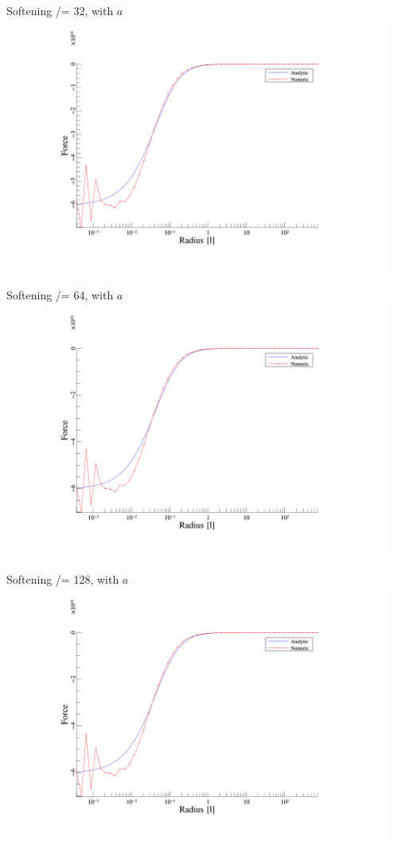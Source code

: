 \begin{frame}{Softening /= 32, with $a$}
	\includegraphics[width=0.95\textwidth]{figures/plots/forces_a_32.png}
\end{frame}

\begin{frame}{Softening /= 64, with $a$}
	\includegraphics[width=0.95\textwidth]{figures/plots/forces_a_64.png}
\end{frame}

\begin{frame}{Softening /= 128, with $a$}
	\includegraphics[width=0.95\textwidth]{figures/plots/forces_a_128.png}
\end{frame}

